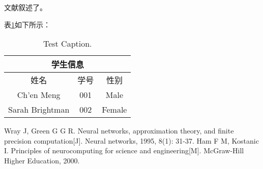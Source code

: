 \documentclass[a4paper, 12pt, centering]{article}
\makeatletter
\newcommand*{\hei}{\CJKfamily{zhhei}}
\newcommand{\xiaosihao}{\fontsize{12pt}{\baselineskip}\selectfont}
\renewcommand\subsection{\@startsection{subsection}{1}{\z@}%
{-1.25ex \@plus -.5ex \@minus -.2ex}%
{.4ex \@plus .1ex}%
{\normalfont\xiaosihao\bf\hei}}
\makeatother
\begin{document}
文献\cite{1}\cite{2}叙述了。


表\ref{tab.main}如下所示：
\begin{table}[H]
\centering
\caption{Test Caption.}
\begin{tabular}{|c|c|c|}
\hline
\multicolumn{3}{|c|}{学生信息}\\
\hline
姓名& 学号& 性别\\
\hline
Ch'en Meng& 001& Male\\
Sarah Brightman& 002& Female\\
\hline
\end{tabular}
\label{tab.main}
\end{table}

\begin{thebibliography}{1}
 Wray J, Green G G R. Neural networks, approximation theory, and finite precision computation[J]. Neural networks, 1995, 8(1): 31-37.
 Ham F M, Kostanic I. Principles of neurocomputing for science and engineering[M]. McGraw-Hill Higher Education, 2000.
\end{thebibliography}
\end{document}
